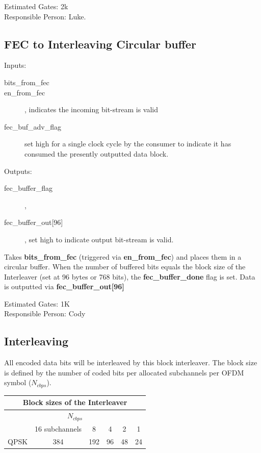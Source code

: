 \documentclass[dvips,10pt,twocolumn]{article}
\begin{document}
	Estimated Gates: 2k \\
	Responsible Person: Luke.

	\subsection{FEC to Interleaving Circular buffer}
	\label{sec:fec_buffer}

	\begin{description}
		\item{Inputs:} \begin{description}
			\item[bits\_from\_fec]
			\item[en\_from\_fec], indicates the incoming
				bit-stream is valid
			\item[fec\_buf\_adv\_flag] set high for a
				single clock cycle by the consumer to
				indicate it has consumed the
				presently outputted data block.
		\end{description}
		\item{Outputs:} \begin{description}
			\item[fec\_buffer\_flag], 
			\item[fec\_buffer\_out{[96]}], set high to indicate
				output bit-stream is valid.
		\end{description}
	\end{description}

	Takes \textbf{bits\_from\_fec} (triggered via
	\textbf{en\_from\_fec}) and places them in a circular
	buffer. When the number of buffered bits equals the block
	size of the Interleaver (set at 96 bytes or 768 bits), the
	\textbf{fec\_buffer\_done} flag is set. Data is outputted
	via \textbf{fec\_buffer\_out[96]}

	Estimated Gates: 1K \\
	Responsible Person: Cody

	\subsection{Interleaving}
	\label{sec:interleaving}
	
	All encoded data bits will be interleaved by this block interleaver. The
	block size is defined by the number of coded bits per allocated subchannels 
	per OFDM symbol ($N_{cbps}$). 
 
	 \begin{center}
  	\begin{tabular}{|c|c|c|c|c|c|}
	\hline
	\multicolumn{6}{|c|}{Block sizes of the Interleaver} \\ \hline
	\multicolumn{6}{|c|}{$N_{cbps}$} \\ \hline
  	& 16 subchannels & 8 & 4 & 2 & 1 \\ \hline
	QPSK & 384 & 192 & 96 & 48 & 24 \\ \hline
	\end{tabular}
  	\end{center}
\end{document}
